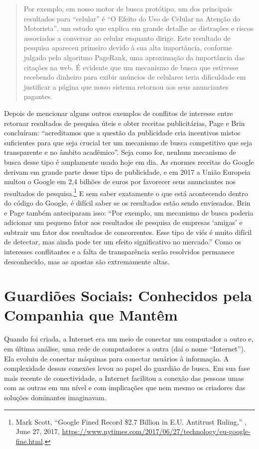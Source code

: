 \begin{quote}
    Por exemplo, em nosso motor de busca protótipo, um dos principais resultados para ``celular''
    é ``O Efeito do Uso de Celular na Atenção do Motorista'', um estudo que explica em grande
    detalhe as distrações e riscos associados a conversar ao celular enquanto dirige. Este
    resultado de pesquisa apareceu primeiro devido à sua alta importância, conforme julgado
    pelo algoritmo PageRank, uma aproximação da importância das citações na web. É evidente que
    um mecanismo de busca que estivesse recebendo dinheiro para exibir anúncios de celulares
    teria dificuldade em justificar a página que nosso sistema retornou aos seus anunciantes
    pagantes.
\end{quote}

Depois de mencionar alguns outros exemplos de conflitos de interesse entre retornar resultados
de pesquisa úteis e obter receitas publicitárias, Page e Brin concluíram: ``acreditamos que a
questão da publicidade cria incentivos mistos suficientes para que seja crucial ter um mecanismo
de busca competitivo que seja transparente e no âmbito acadêmico''. Seja como for, nenhum
mecanismo de busca desse tipo é amplamente usado hoje em dia. As enormes receitas do Google
derivam em grande parte desse tipo de publicidade, e em 2017 a União Europeia multou o Google
em 2,4 bilhões de euros por favorecer seus anunciantes nos resultados de pesquisa.\footnote{Mark
Scott, ``Google Fined Record \$2.7 Billion in E.U. Antitrust Ruling,'' ,
June 27, 2017, \url{https://www.nytimes.com/2017/06/27/technology/eu-google-fine.html}.} E sem
saber exatamente o que está acontecendo dentro do código do Google, é difícil saber se os
resultados estão sendo enviesados. Brin e Page também anteciparam isso: ``Por exemplo, um mecanismo
de busca poderia adicionar um pequeno fator aos resultados de pesquisa de empresas `amigas' e
subtrair um fator dos resultados de concorrentes. Esse tipo de viés é muito difícil de detectar,
mas ainda pode ter um efeito significativo no mercado.'' Como os interesses conflitantes e a
falta de transparência serão resolvidos permanece desconhecido, mas as apostas são extremamente
altas.

\section{Guardiões Sociais: Conhecidos pela Companhia que Mantêm}
\label{gatekeepers:guardioes-sociais}

Quando foi criada, a Internet era um meio de conectar um computador a outro e, em última
análise, uma rede de computadores a outra (daí o nome ``Internet''). Ela evoluiu de conectar
máquinas para conectar usuários à informação. A complexidade dessas conexões levou ao papel do
guardião de busca. Em sua fase mais recente de conectividade, a Internet facilitou a conexão das
pessoas umas com as outras em um nível e com implicações que nem mesmo os criadores das soluções
dominantes imaginavam.

